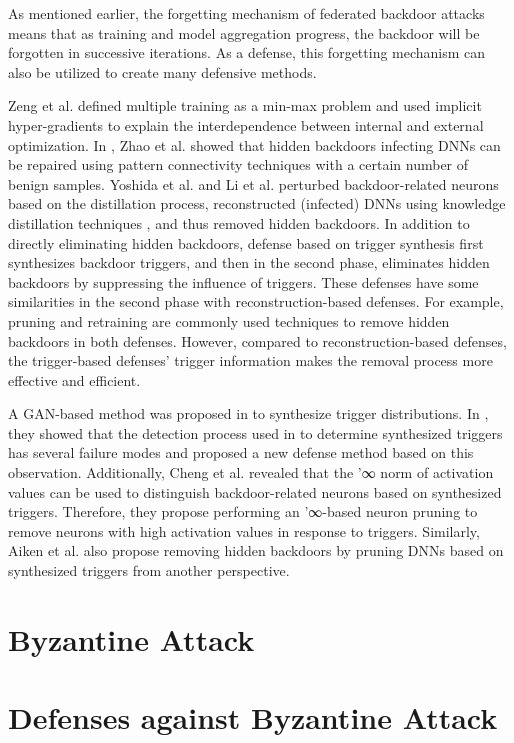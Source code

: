 \documentclass[conference]{IEEEtran}
\begin{document}
As mentioned earlier, the forgetting mechanism of federated backdoor attacks means that as training and model aggregation progress, 
the backdoor will be forgotten in successive iterations. As a defense, this forgetting mechanism can also be utilized to create many defensive methods.

Zeng et al. \cite{b90}defined multiple training as a min-max problem and used implicit hyper-gradients to 
explain the interdependence between internal and external optimization.  
In \cite{b91}, Zhao et al. showed that hidden backdoors infecting DNNs can be repaired using pattern connectivity techniques with a certain number of benign samples. 
Yoshida et al.  and Li et al. \cite{b92} perturbed backdoor-related neurons based on the distillation process, reconstructed (infected) DNNs using knowledge 
distillation techniques , and thus removed hidden backdoors.
In addition to directly eliminating hidden backdoors, defense based on trigger synthesis first 
synthesizes backdoor triggers, and then in the second phase, eliminates hidden backdoors by suppressing the influence of triggers. 
These defenses have some similarities in the second phase with reconstruction-based defenses. For example, 
pruning and retraining are commonly used techniques to remove hidden backdoors in both defenses. However, 
compared to reconstruction-based defenses, the trigger-based defenses' trigger information makes the removal process more effective and efficient.

A GAN-based method was proposed in \cite{b93} to synthesize trigger distributions. 
In \cite{b94}, they showed that the detection process used in \cite{b95} to determine synthesized 
triggers has several failure modes and proposed a new defense method based on this observation. 
Additionally, Cheng et al. \cite{b96} revealed that the '∞ norm of activation values can be used to 
distinguish backdoor-related neurons based on synthesized triggers. Therefore, they propose performing an 
'∞-based neuron pruning to remove neurons with high activation values in response to triggers. 
Similarly, Aiken et al.\cite{b97} also propose removing hidden backdoors 
by pruning DNNs based on synthesized triggers from another perspective. 


\section{Byzantine Attack}
\section{Defenses against Byzantine Attack}
\end{document}
